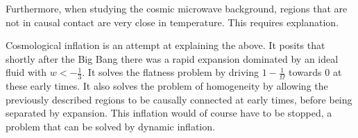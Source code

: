 Furthermore, when studying the cosmic microwave background, regions that are not in causal contact are very close in temperature. This requires explanation.

Cosmological inflation is an attempt at explaining the above. It posits that shortly after the Big Bang there was a rapid expansion dominated by an ideal fluid with $w < -\frac{1}{3}$. It solves the flatness problem by driving $1 - \frac{1}{\Omega}$ towards $0$ at these early times. It also solves the problem of homogeneity by allowing the previously described regions to be causally connected at early times, before being separated by expansion. This inflation would of course have to be stopped, a problem that can be solved by dynamic inflation.